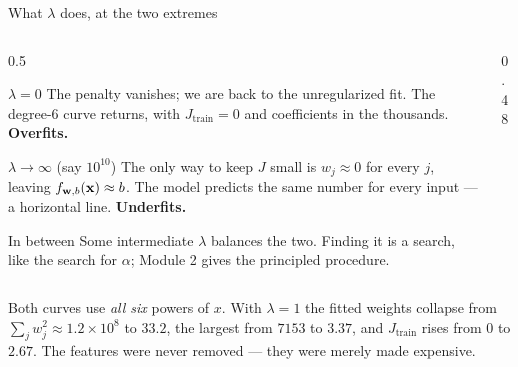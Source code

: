 \documentclass[aspectratio=169,10pt]{beamer}
\begin{document}
\begin{frame}{What $\lambda$ does, at the two extremes}
  \begin{columns}[T,onlytextwidth]
    \begin{column}{0.5\textwidth}
      \footnotesize
      \begin{block}{$\lambda = 0$}
        The penalty vanishes; we are back to the unregularized fit. The degree-$6$ curve
        returns, with $J_{\text{train}}=0$ and coefficients in the thousands.
        \hfill\textbf{Overfits.}
      \end{block}
      \begin{block}{$\lambda \to \infty$ (say $10^{10}$)}
        The only way to keep $J$ small is $w_j \approx 0$ for every $j$, leaving
        $f_{\mathbf{w},b}(\mathbf{x}) \approx b$. The model predicts the same number for every input --- a
        horizontal line. \hfill\textbf{Underfits.}
      \end{block}
      \begin{block}{In between}
        Some intermediate $\lambda$ balances the two. Finding it is a search, like the search
        for $\alpha$; Module 2 gives the principled procedure.
      \end{block}
    \end{column}
    \begin{column}{0.48\textwidth}
      \par
    \end{column}
  \end{columns}
  \vspace{0.5mm}
  \footnotesize
  Both curves use \emph{all six} powers of $x$. With $\lambda=1$ the fitted weights collapse
  from $\sum_j w_j^2 \approx 1.2\times10^{8}$ to $33.2$, the largest from $7153$ to $3.37$,
  and $J_{\text{train}}$ rises from $0$ to $2.67$. The features were never removed --- they
  were merely made expensive.
\end{frame}
\end{document}
